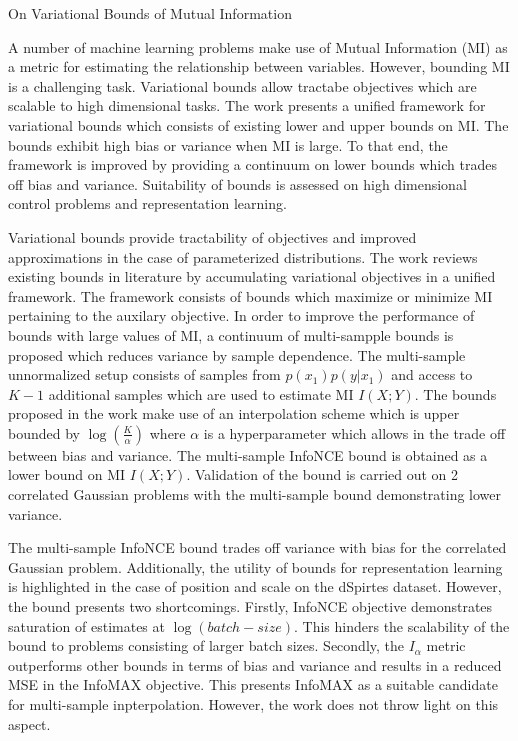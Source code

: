 \documentclass[11pt,letterpaper]{article}
\begin{document}
\begin{center}
  \large{On Variational Bounds of Mutual Information}
\end{center}



A number of machine learning problems make use of Mutual Information (MI) as a metric for estimating the relationship between variables. However, bounding MI is a challenging task. Variational bounds allow tractabe objectives which are scalable to high dimensional tasks. The work presents a unified framework for variational bounds which consists of existing lower and upper bounds on MI. The bounds exhibit high bias or variance when MI is large. To that end, the framework is improved by providing a continuum on lower bounds which trades off bias and variance. Suitability of bounds is assessed on high dimensional control problems and representation learning. 

Variational bounds provide tractability of objectives and improved approximations in the case of parameterized distributions. The work reviews existing bounds in literature by accumulating variational objectives in a unified framework. The framework consists of bounds which maximize or minimize MI pertaining to the auxilary objective. In order to improve the performance of bounds with large values of MI, a continuum of multi-sampple bounds is proposed which reduces variance by sample dependence. The multi-sample unnormalized setup consists of samples from $p(x_{1})p(y|x_{1})$ and access to $K-1$ additional samples which are used to estimate MI $I(X;Y)$. The bounds proposed in the work make use of an interpolation scheme which is upper bounded by $\log(\frac{K}{\alpha})$ where $\alpha$ is a hyperparameter which allows in the trade off between bias and variance. The multi-sample InfoNCE bound is obtained as a lower bound on MI $I(X;Y)$. Validation of the bound is carried out on 2 correlated Gaussian problems with the multi-sample bound demonstrating lower variance.

The multi-sample InfoNCE bound trades off variance with bias for the correlated Gaussian problem. Additionally, the utility of bounds for representation learning is highlighted in the case of position and scale on the dSpirtes dataset. However, the bound presents two shortcomings. Firstly, InfoNCE objective demonstrates saturation of estimates at $\log(batch-size)$. This hinders the scalability of the bound to problems consisting of larger batch sizes. Secondly, the $I_{\alpha}$ metric outperforms other bounds in terms of bias and variance and results in a reduced MSE in the InfoMAX objective. This presents InfoMAX as a suitable candidate for multi-sample inpterpolation. However, the work does not throw light on this aspect. 
\end{document}
